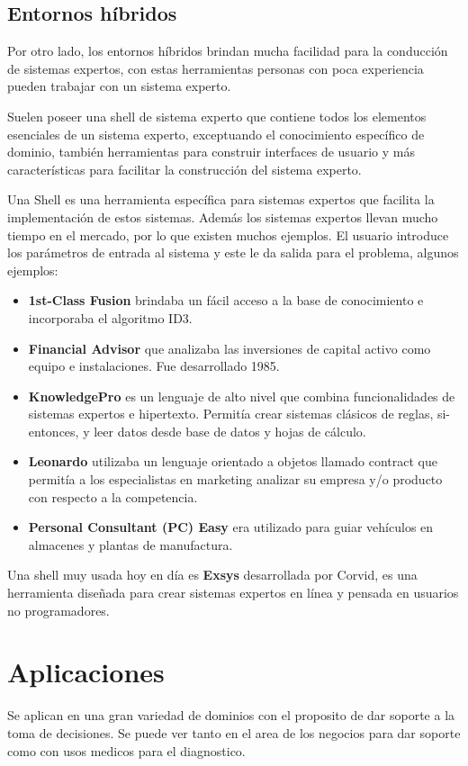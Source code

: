 \documentclass[12pt, twoside, openright]{report} %
\begin{document}
\subsection{Entornos híbridos}
Por otro lado, los entornos híbridos brindan mucha facilidad para la conducción de sistemas expertos, con estas herramientas personas con poca experiencia pueden trabajar con un sistema experto. 
 
Suelen poseer una shell de sistema experto que contiene todos los elementos esenciales de un sistema experto, exceptuando el conocimiento específico de dominio, también herramientas para construir interfaces de usuario y más características para facilitar la construcción del sistema experto.
 
Una Shell es una herramienta específica para sistemas expertos que facilita la implementación de estos sistemas. Además los sistemas expertos llevan mucho tiempo en el mercado, por lo que existen muchos ejemplos. El usuario introduce los parámetros de entrada al sistema y este le da salida para el problema, algunos ejemplos:
 \begin{itemize}
     \item \textbf{1st-Class Fusion} brindaba un fácil acceso a la base de conocimiento e incorporaba el algoritmo ID3.
     \item \textbf{Financial Advisor} que analizaba las inversiones de capital activo como equipo e instalaciones. Fue desarrollado 1985.
     \item \textbf{KnowledgePro} es un lenguaje de alto nivel que combina funcionalidades de sistemas expertos e hipertexto. Permitía crear sistemas clásicos de reglas, si-entonces, y leer datos desde base de datos y hojas de cálculo.
     \item \textbf{Leonardo} utilizaba un lenguaje orientado a objetos llamado contract que permitía a los especialistas en marketing analizar su empresa y/o producto con respecto a la competencia.
     \item \textbf{Personal Consultant (PC) Easy} era utilizado para guiar vehículos en almacenes y plantas de manufactura.
 \end{itemize}
 
Una shell muy usada hoy en día es \textbf{Exsys} desarrollada por Corvid, es una herramienta diseñada para crear sistemas expertos en línea y pensada en usuarios no programadores.
\section{Aplicaciones}
Se aplican en una gran variedad de dominios con el proposito de dar soporte a la toma de decisiones. Se puede ver tanto en el area de los negocios para dar soporte como con usos medicos para el diagnostico.
\end{document}
